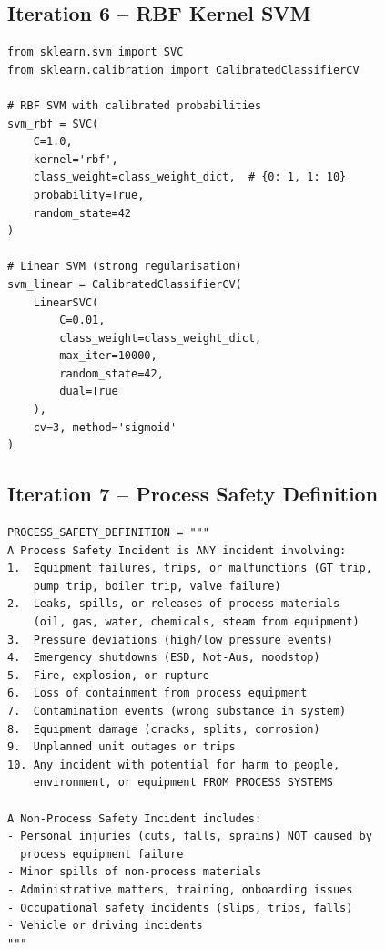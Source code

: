 \documentclass[11pt, titlepage, bibliography=totoc]{scrreprt}
\begin{document}
\subsection*{Iteration 6 -- RBF Kernel SVM}

\begin{lstlisting}[label=lst:rbf-svm,
  caption={Non-linear RBF kernel SVM with strong regularisation ($C=1.0$, $\gamma=\text{scale}$) and calibrated probability outputs, as used in Iteration~6.}]
from sklearn.svm import SVC
from sklearn.calibration import CalibratedClassifierCV

# RBF SVM with calibrated probabilities
svm_rbf = SVC(
    C=1.0,
    kernel='rbf',
    class_weight=class_weight_dict,  # {0: 1, 1: 10}
    probability=True,
    random_state=42
)

# Linear SVM (strong regularisation)
svm_linear = CalibratedClassifierCV(
    LinearSVC(
        C=0.01,
        class_weight=class_weight_dict,
        max_iter=10000,
        random_state=42,
        dual=True
    ),
    cv=3, method='sigmoid'
)
\end{lstlisting}

\subsection*{Iteration 7 -- Process Safety Definition}

\begin{lstlisting}[label=lst:ps-definition,
  caption={Natural-language Process Safety definition injected into all few-shot prompts in Iteration~7.}]
PROCESS_SAFETY_DEFINITION = """
A Process Safety Incident is ANY incident involving:
1.  Equipment failures, trips, or malfunctions (GT trip,
    pump trip, boiler trip, valve failure)
2.  Leaks, spills, or releases of process materials
    (oil, gas, water, chemicals, steam from equipment)
3.  Pressure deviations (high/low pressure events)
4.  Emergency shutdowns (ESD, Not-Aus, noodstop)
5.  Fire, explosion, or rupture
6.  Loss of containment from process equipment
7.  Contamination events (wrong substance in system)
8.  Equipment damage (cracks, splits, corrosion)
9.  Unplanned unit outages or trips
10. Any incident with potential for harm to people,
    environment, or equipment FROM PROCESS SYSTEMS

A Non-Process Safety Incident includes:
- Personal injuries (cuts, falls, sprains) NOT caused by
  process equipment failure
- Minor spills of non-process materials
- Administrative matters, training, onboarding issues
- Occupational safety incidents (slips, trips, falls)
- Vehicle or driving incidents
"""
\end{lstlisting}
\end{document}
